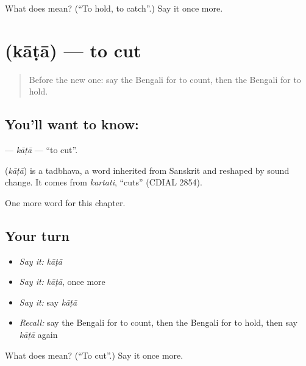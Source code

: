 \begin{tcolorbox}[breakable,colback=teal!4,colframe=teal!35!black,title={Before you move on}]
What does  mean? (\textquotedblleft{}To hold, to catch\textquotedblright{}.) Say it once more.
\end{tcolorbox}
\section[\texorpdfstring{\bn{কাটা} (kāṭā)}{কাটা (kāṭā)}]{ (kāṭā) — to cut}

\label{lesson:BN-C52-kata}



\begin{quote}
Before the new one: say the Bengali for to count, then the Bengali for to hold.
\end{quote}

\subsection*{You'll want to know: }
\textbf{} — \emph{kāṭā} — \textquotedblleft{}to cut\textquotedblright{}.

\begin{cousinweb}
\textbf{} (\emph{kāṭā}) is a tadbhava, a word inherited from Sanskrit and reshaped by sound change. It comes from \emph{kartati}, \textquotedblleft{}cuts\textquotedblright{} (CDIAL 2854).
\end{cousinweb}

\begin{grammarlens}[title={What you've built}]
One more word for this chapter.
\end{grammarlens}

\subsection*{Your turn}
\begin{itemize}
\raggedright
  \item \emph{Say it:} \emph{kāṭā}
  \item \emph{Say it:} \emph{kāṭā}, once more
  \item \emph{Say it:} say \emph{kāṭā}
  \item \emph{Recall:} say the Bengali for to count, then the Bengali for to hold, then say \emph{kāṭā} again
\end{itemize}

\begin{tcolorbox}[breakable,colback=teal!4,colframe=teal!35!black,title={Before you move on}]
What does  mean? (\textquotedblleft{}To cut\textquotedblright{}.) Say it once more.
\end{tcolorbox}
